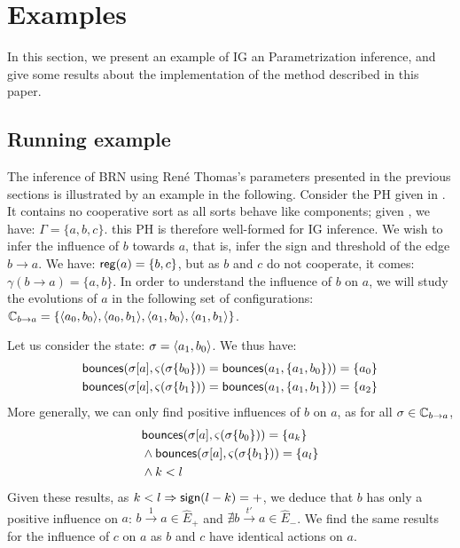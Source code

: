 \section{Examples}\label{sec:examples}

In this section, we present an example of IG an Parametrization inference, and give some results about the implementation of the method described in this paper.

\subsection{Running example}
The inference of BRN using René Thomas's parameters presented in the previous sections is illustrated by an example in the following.
Consider the PH given in .
It contains no cooperative sort as all sorts behave like components; given , we have: $\Gamma = \{a, b, c\}$.
this PH is therefore well-formed for IG inference.
We wish to infer the influence of $b$ towards $a$, that is, infer the sign and threshold of the edge $b \rightarrow a$.
We have: $\mathsf{reg}({a}) = \{b, c\}$, but as $b$ and $c$ do not cooperate, it comes: $\gamma(b \rightarrow a) = \{a, b\}$.
In order to understand the influence of $b$ on $a$, we will study the evolutions of $a$ in the following set of configurations: $\mathbb C_{b\rightarrow a} = \{\mbox{$\langle a_0, b_0 \rangle$}, \mbox{$\langle a_0, b_1 \rangle$}, \mbox{$\langle a_1, b_0 \rangle$}, \mbox{$\langle a_1, b_1 \rangle$}\}$.

Let us consider the state: $\sigma = \mbox{$\langle a_1, b_0 \rangle$}$. We thus have:
\begin{align*}
\mathsf{bounces}({\sigma[a]},\varsigma(\sigma\{b_0\})) &= \mathsf{bounces}(a_1,\{a_1, b_0\})) = \{a_0\} \\
\mathsf{bounces}({\sigma[a]},\varsigma(\sigma\{b_1\})) &= \mathsf{bounces}(a_1,\{a_1, b_1\})) = \{a_2\}
\end{align*}
More generally, we can only find positive influences of $b$ on $a$, as for all $\sigma \in \mathbb C_{b\rightarrow a}$,
\begin{align*}
&\mathsf{bounces}({\sigma[a]},\varsigma(\sigma\{b_0\})) = \{a_k\} \\
&\wedge \mathsf{bounces}({\sigma[a]},\varsigma(\sigma\{b_1\})) = \{a_l\} \\
&\wedge k < l
\end{align*}
Given these results, as $k < l \Rightarrow \mathsf{sign}(l - k) = +$, we deduce that $b$ has only a positive influence on $a$:
$b \xrightarrow{1} a \in \hat{E}_+$ and $\nexists b \xrightarrow{t'} a \in \hat{E}_-$.
We find the same results for the influence of $c$ on $a$ as $b$ and $c$ have identical actions on $a$.

